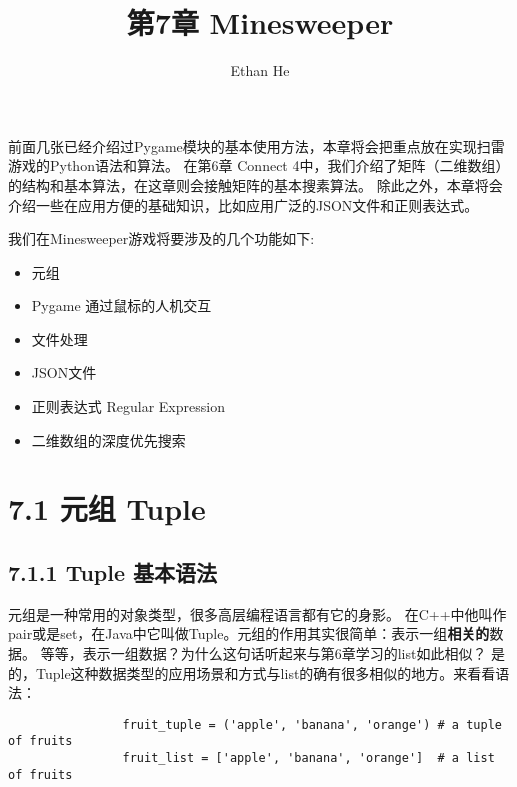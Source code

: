 \documentclass[12pt]{article}
\title{第7章 Minesweeper}
\author{Ethan He}
\date{}
\begin{document}
    \maketitle
    前面几张已经介绍过Pygame模块的基本使用方法，本章将会把重点放在实现扫雷游戏的Python语法和算法。
    在第6章 Connect 4中，我们介绍了矩阵（二维数组）的结构和基本算法，在这章则会接触矩阵的基本搜素算法。
    除此之外，本章将会介绍一些在应用方便的基础知识，比如应用广泛的JSON文件和正则表达式。%
    
    我们在Minesweeper游戏将要涉及的几个功能如下:
    \begin{itemize}
        \item 元组
        \item Pygame 通过鼠标的人机交互
        \item 文件处理
        \item JSON文件
        \item 正则表达式 Regular Expression
        \item 二维数组的深度优先搜索
    \end{itemize}
    
    \section*{7.1 元组 Tuple}
        \subsection*{7.1.1 Tuple 基本语法}
            元组是一种常用的对象类型，很多高层编程语言都有它的身影。
            在C++中他叫作pair或是set，在Java中它叫做Tuple。元组的作用其实很简单：表示一组\textbf{相关的}数据。
            等等，表示一组数据？为什么这句话听起来与第6章学习的list如此相似？
            是的，Tuple这种数据类型的应用场景和方式与list的确有很多相似的地方。来看看语法：
            \begin{lstlisting}
                fruit_tuple = ('apple', 'banana', 'orange') # a tuple of fruits
                fruit_list = ['apple', 'banana', 'orange']  # a list of fruits
            \end{lstlisting}
\end{document}
